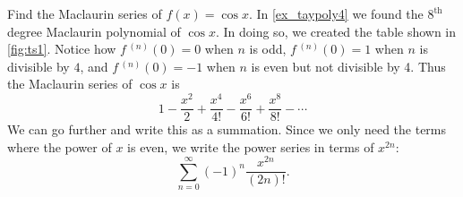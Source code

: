 \begin{example}[The Maclaurin series of $f(x) = \cos x$]\label{ex_ts1}
Find the Maclaurin series of $f(x)=\cos x$.
\solution
In \autoref{ex_taypoly4} we found the $8^\text{th}$ degree Maclaurin polynomial of $\cos x$. In doing so, we created the table shown in \autoref{fig:ts1}.
%
%
Notice how $f\,^{(n)}(0)=0$ when $n$ is odd,  $f\,^{(n)}(0)=1$ when $n$ is divisible by $4$, and $f\,^{(n)}(0)=-1$ when $n$ is even but not divisible by 4. Thus the Maclaurin series of $\cos x$ is
\[1-\frac{x^2}2+\frac{x^4}{4!}-\frac{x^6}{6!}+\frac{x^8}{8!} - \dotsb\]
We can go further and write this as a summation. Since we only need the terms where the power of $x$ is even, we write the power series in terms of $x^{2n}$:
\[\sum_{n=0}^\infty (-1)^{n}\frac{x^{2n}}{(2n)!}.\]
\end{example}


